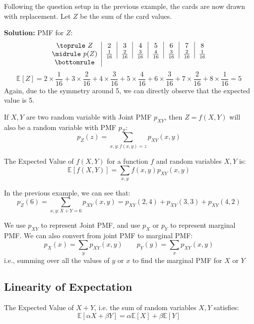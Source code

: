 \begin{eg}
    Following the question setup in the previous example, the cards are now drawn with replacement. Let \(Z\) be the sum of the card values. 

    \textbf{Solution:} 
    PMF for \(Z\):
    \[
        \begin{tabular}{c|c|c|c|c|c|c|c}
            \toprule
                \(Z\)  & 2 & 3 & 4 & 5 & 6 & 7 & 8  \\
            \midrule
                \(p(Z)\) & \(\frac{1}{16}\) & \(\frac{2}{16}\) & \(\frac{3}{16}\) & \(\frac{4}{16}\) & \(\frac{3}{16}\) & \(\frac{2}{16}\) & \(\frac{1}{16}\) \\
            \bottomrule
        \end{tabular}
    \]
    \[
        \mathbb{E}[Z] = 2 \times \dfrac{1}{16} + 3 \times \dfrac{2}{16} + 4 \times \dfrac{3}{16} + 5 \times \dfrac{4}{16} + 6 \times \dfrac{3}{16} + 7 \times \dfrac{2}{16} + 8 \times \dfrac{1}{16} = 5
    \]
    Again, due to the symmetry around 5, we can directly observe that the expected value is 5.
\end{eg}

If \(X, Y\) are two random variable with Joint PMF \(p_{XY} \), then \(Z=f(X, Y)\) will also be a random variable with PMF \(p_Z\): 
\[
    p_Z(z) = \sum_{x, y: f(x, y) = z} p_{XY}(x, y) 
\]

The Expected Value of \(f(X, Y)\) for a function \(f\) and random variables \(X, Y\) is:
\[
    \mathbb{E}[f(X, Y)] = \sum_{x, y} f(x, y)p_{XY}(x, y) 
\]

In the previous example, we can see that: 
\[
    p_Z(6) = \sum_{x, y: X + Y = 6} p_{XY}(x, y) = p_{XY}(2, 4) + p_{XY}(3, 3) + p_{XY}(4, 2)
\]

\begin{remark}
    We use \(p_{XY}\) to represent Joint PMF, and use \(p_X\) or \(p_Y\) to represent marginal PMF. We can also convert from joint PMF to marginal PMF: 
    \[
        p_X(x) = \sum_{y} p_{XY} (x, y) \quad\quad p_Y(y) = \sum_{x} p_{XY} (x, y)
    \]
    i.e., summing over all the values of \(y\) or \(x\) to find the marginal PMF for \(X\) or \(Y\) 
\end{remark}

\subsection{Linearity of Expectation}
The Expected Value of \(X + Y\), i.e. the sum of random variables \(X, Y\) satisfies: 
\[
    \mathbb{E}[\alpha X + \beta Y] = \alpha \mathbb{E}[X] + \beta \mathbb{E}[Y]
\]

